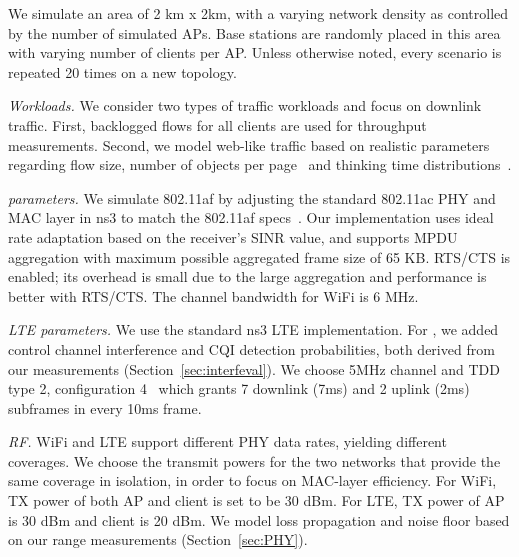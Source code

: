 


We simulate an area of 2 km x 2km, with a varying network density as controlled by the number of simulated APs. 
Base stations are randomly placed in this area with varying number of clients per AP. 
Unless otherwise noted, every scenario is repeated 20 times on a new topology. 

{\em Workloads.} We consider two types of traffic workloads and focus on downlink traffic. 
First, backlogged flows for all clients are used for throughput measurements. Second, 
we model web-like traffic based on realistic parameters regarding flow size, 
number of objects per page~\cite{trafficmodel} and thinking time distributions~\cite{thinktime}. 



{\em \wf parameters.} We simulate 802.11af by adjusting the standard 802.11ac PHY and MAC layer in ns3 to match the 802.11af specs~\cite{Rice_af}. 
Our \wf implementation uses ideal rate adaptation based on the 
receiver's SINR value, and supports MPDU aggregation with maximum possible aggregated frame size of 65 KB. 
RTS/CTS is enabled; its overhead is small due to the large aggregation and \wf performance is better with RTS/CTS.
The channel bandwidth for WiFi is 6 MHz.

{\em LTE parameters.} We use the standard ns3 LTE implementation. For \cf, we added 
control channel interference and CQI detection probabilities, both derived from our measurements (Section~\ref{sec:interfeval}).
We choose 5MHz channel and TDD type 2, configuration 4~\cite{36_211} which grants 7 downlink (7ms) and 2 uplink (2ms) subframes in every 10ms frame.


{\em RF.} WiFi and LTE support different PHY data rates, yielding different coverages. 
We choose the transmit powers for the two networks that provide the same coverage in isolation, 
in order to focus on MAC-layer efficiency.
For WiFi, TX power of both AP and client is set to be 30 dBm. For LTE, TX power of AP is 30 dBm and client is 20 dBm. 
We model loss propagation and noise floor based on our range measurements (Section~\ref{sec:PHY}).



